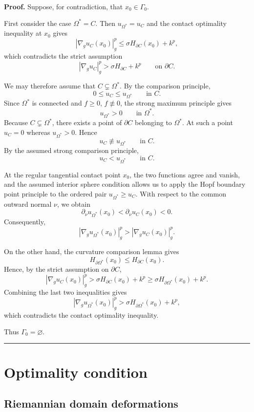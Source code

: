 \documentclass{article}
\newenvironment{proof}[1][Proof]{\textbf{#1.} }{\hfill\rule{0.5em}{0.5em}}
\begin{document}
\begin{proof}
Suppose, for contradiction, that $x_0\in\Gamma_0$.

First consider the case $\Omega^*=C$. Then
$u_{\Omega^*}=u_C$ and the contact optimality inequality at $x_0$
gives
\[
|\nabla_g u_C(x_0)|_g^p
\leq
\sigma H_{\partial C}(x_0)+k^p,
\]
which contradicts the strict assumption
\[
|\nabla_g u_C|_g^p
>
\sigma H_{\partial C}+k^p
\qquad\text{on }\partial C.
\]

We may therefore assume that $C\subsetneq\Omega^*$. By the comparison
principle,
\[
0\leq u_C\leq u_{\Omega^*}
\qquad\text{in }C.
\]
Since $\Omega^*$ is connected and $f\geq0$, $f\not\equiv0$, the strong
maximum principle gives
\[
u_{\Omega^*}>0\qquad\text{in }\Omega^*.
\]
Because $C\subsetneq\Omega^*$, there exists a point of
$\partial C$ belonging to $\Omega^*$. At such a point
$u_C=0$ whereas $u_{\Omega^*}>0$. Hence
\[
u_C\not\equiv u_{\Omega^*}\qquad\text{in }C.
\]
By the assumed strong comparison principle,
\[
u_C<u_{\Omega^*}\qquad\text{in }C.
\]

At the regular tangential contact point $x_0$, the two functions agree
and vanish, and the assumed interior sphere condition allows us to apply
the Hopf boundary point principle to the ordered pair
$u_{\Omega^*}\geq u_C$. With respect to the common outward normal
$\nu$, we obtain
\[
\partial_\nu u_{\Omega^*}(x_0)
<
\partial_\nu u_C(x_0)<0.
\]
Consequently,
\[
|\nabla_g u_{\Omega^*}(x_0)|_g^p
>
|\nabla_g u_C(x_0)|_g^p.
\]

On the other hand, the curvature comparison lemma gives
\[
H_{\partial\Omega^*}(x_0)
\leq
H_{\partial C}(x_0).
\]
Hence, by the strict assumption on $\partial C$,
\[
|\nabla_g u_C(x_0)|_g^p
>
\sigma H_{\partial C}(x_0)+k^p
\geq
\sigma H_{\partial\Omega^*}(x_0)+k^p.
\]
Combining the last two inequalities gives
\[
|\nabla_g u_{\Omega^*}(x_0)|_g^p
>
\sigma H_{\partial\Omega^*}(x_0)+k^p,
\]
which contradicts the contact optimality inequality.

Thus $\Gamma_0=\varnothing$.
\end{proof}


\section{Optimality condition}

\subsection{Riemannian domain deformations}
\end{document}

